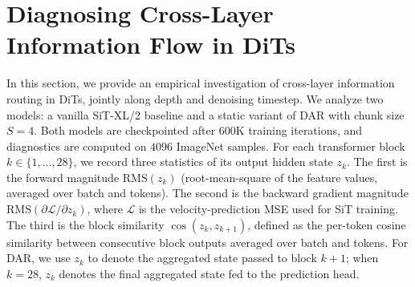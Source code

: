 \documentclass[]{ant_tech_report}
\begin{document}

\section{Diagnosing Cross-Layer Information Flow in DiTs}   \label{sec:diagnose}

In this section, we provide an empirical investigation of cross-layer information routing in DiTs, jointly along depth and denoising timestep. 
We analyze two models: a vanilla SiT-XL/2 baseline and a static variant of \textsc{DAR} with chunk size $S = 4$. Both models are checkpointed after $600\text{K}$ training iterations, and diagnostics are computed on $4096$ ImageNet samples. For each transformer block $k \in \{1, \ldots, 28\}$, we record three statistics of its output hidden state $z_k$. The first is the forward magnitude $\mathrm{RMS}(z_k)$ (root-mean-square of the feature values, averaged over batch and tokens). The second is the backward gradient magnitude $\mathrm{RMS}(\partial\mathcal{L}/\partial z_k)$, where $\mathcal{L}$ is the velocity-prediction MSE used for SiT training. The third is the block similarity $\cos(z_k, z_{k+1})$, defined as the per-token cosine similarity between consecutive block outputs averaged over batch and tokens. For \textsc{DAR}, we use $z_k$ to denote the aggregated state passed to block $k+1$; when $k = 28$, $z_k$ denotes the final aggregated state fed to the prediction head.
\end{document}
